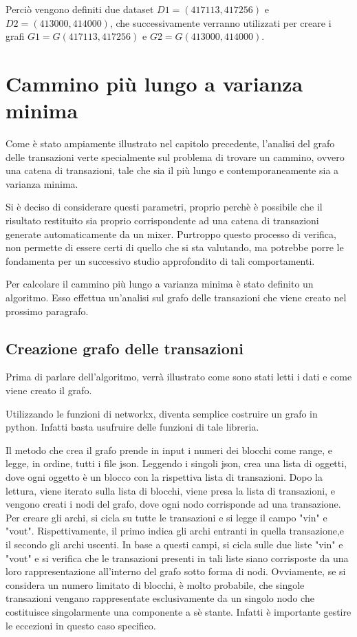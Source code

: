Perciò vengono definiti due dataset $D1=(417113,417256)$ e $D2=(413000,414000)$, che successivamente verranno utilizzati per creare i grafi $G1=G(417113,417256)$ e $G2=G(413000,414000)$.

\section{Cammino più lungo a varianza minima}

Come è stato ampiamente illustrato nel capitolo precedente, l'analisi del grafo delle transazioni verte specialmente sul problema di trovare un cammino, ovvero una catena di transazioni, tale che sia il più lungo e contemporaneamente sia a varianza minima.

Si è deciso di considerare questi parametri, proprio perchè è possibile che il risultato restituito sia proprio corrispondente ad una catena di transazioni generate automaticamente da un mixer. Purtroppo questo processo di verifica, non permette di essere certi di quello che si sta valutando, ma potrebbe porre le fondamenta per un successivo studio approfondito di tali comportamenti.

Per calcolare il cammino più lungo a varianza minima è stato definito un algoritmo. Esso effettua un'analisi sul grafo delle transazioni che viene creato nel prossimo paragrafo.

\subsection{Creazione grafo delle transazioni}
Prima di parlare dell'algoritmo, verrà illustrato come sono stati letti i dati e come viene creato il grafo.

Utilizzando le funzioni di networkx, diventa semplice costruire un grafo in python. Infatti basta usufruire delle funzioni di tale libreria.

Il metodo che crea il grafo prende in input i numeri dei blocchi come range, e legge, in ordine, tutti i file json. Leggendo i singoli json, crea una lista di oggetti, dove ogni oggetto è un blocco con la rispettiva lista di transazioni. Dopo la lettura, viene iterato sulla lista di blocchi, viene presa la lista di transazioni, e vengono creati i nodi del grafo, dove ogni nodo corrisponde ad una transazione. Per creare gli archi, si cicla su tutte le transazioni e si legge il campo "vin" e "vout". Rispettivamente, il primo indica gli archi entranti in quella transazione,e il secondo gli archi uscenti. In base a questi campi, si cicla sulle due liste "vin" e "vout" e si verifica che le transazioni presenti in tali liste siano corrisposte da una loro rappresentazione all'interno del grafo sotto forma di nodi. Ovviamente, se si considera un numero limitato di blocchi, è molto probabile, che singole transazioni vengano rappresentate esclusivamente da un singolo nodo che costituisce singolarmente una componente a sè stante. Infatti è importante gestire le eccezioni in questo caso specifico.

